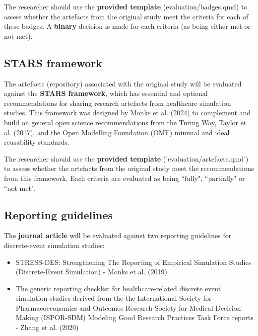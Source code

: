 The researcher should use the \textbf{provided template} (evaluation/badges.qmd) to assess whether the artefacts from the original study meet the criteria for each of these badges. A \textbf{binary} decision is made for each criteria (as being either met or not met).

\vspace{0.5cm}
\subsection{STARS framework}

The artefacts (repository) associated with the original study will be evaluated against the \textbf{STARS framework}, which has essential and optional recommendations for sharing research artefacts from healthcare simulation studies. This framework was designed by Monks et al. (2024)\autocite{monks_towards_2024} to complement and build on general open science recommendations from the Turing Way,\autocite{the_turing_way_community_turing_2022} Taylor et al. (2017),\autocite{taylor_open_2017} and the Open Modelling Foundation (OMF) minimal and ideal reusability standards.\autocite{the_open_modeling_foundation_omf_reusability_2024}

The researcher should use the \textbf{provided template} ('evaluation/artefacts.qmd') to assess whether the artefacts from the original study meet the recommendations from this framework. Each criteria are evaluated as being ``fully", ``partially" or ``not met".

\vspace{0.5cm}
\subsection{Reporting guidelines} \label{sec:reporting}

The \textbf{journal article} will be evaluated against two reporting guidelines for discrete-event simulation studies:
\begin{itemize}
    \item STRESS-DES: Strengthening The Reporting of Empirical Simulation Studies (Discrete-Event Simulation) - Monks et al. (2019)\autocite{monks_strengthening_2019}
    \item The generic reporting checklist for healthcare-related discrete event simulation studies derived from the the International Society for Pharmacoeconomics and Outcomes Research Society for Medical Decision Making (ISPOR-SDM) Modeling Good Research Practices Task Force reports - Zhang et al. (2020)\autocite{zhang_reporting_2020}
\end{itemize}


